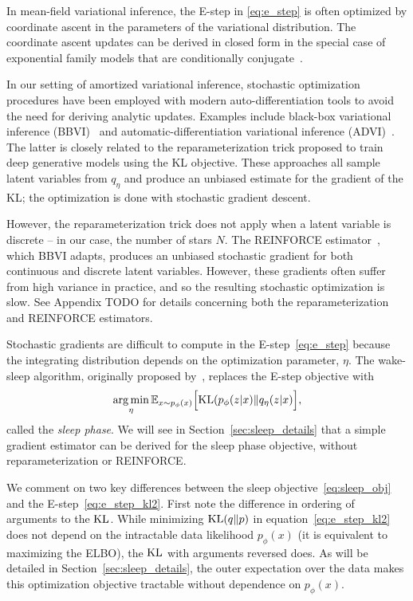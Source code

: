In mean-field variational inference, the E-step in \eqref{eq:e_step} is often optimized by coordinate ascent in the parameters of the variational distribution. 
The coordinate ascent updates can be derived in closed form in the special case of exponential family models that are conditionally conjugate~\cite{Blei_2017_vi_review}. 

In our setting of amortized variational inference, stochastic 
optimization procedures have been employed with modern 
auto-differentiation tools to avoid the need for deriving 
analytic updates. Examples include black-box variational inference (BBVI)~\cite{ranganath2013black} 
and automatic-differentiation variational inference (ADVI)~\cite{kucukelbir2016automatic}. The latter 
is closely related to the reparameterization trick \cite{kingma2013autoencoding, rezende2014stochastic} proposed to train deep generative models using the KL objective. 
These approaches all sample latent variables from $q_\eta$ and produce an unbiased estimate 
for the gradient of the KL; the optimization is done with stochastic gradient descent. 

However, the reparameterization trick does not apply when a latent variable is discrete -- in our case, the number of stars $N$. The REINFORCE estimator~\cite{Williams1992reinforce}, which BBVI adapts, produces an unbiased stochastic gradient for both continuous and discrete latent variables. However, these gradients often suffer from high variance in practice, and so the resulting stochastic optimization is slow. See Appendix TODO for details concerning both the reparameterization and REINFORCE estimators. 

Stochastic gradients are difficult to compute in the E-step~\eqref{eq:e_step} because the integrating distribution depends on the optimization parameter, $\eta$. 
The wake-sleep algorithm, originally proposed by~\cite{Hinton1995wake_sleep}, replaces the 
E-step objective with 
\begin{align}
    \operatorname*{arg\,min}_{\eta} \mathbb{E}_{x \sim p_\phi(x)}\Big[\textrm{KL}(p_\phi(z | x) \| q_\eta(z | x)\Big]
    \label{eq:sleep_obj},
\end{align}
called the {\itshape sleep phase}. We will see in Section~\ref{sec:sleep_details} that a simple gradient estimator can be derived for the sleep phase objective, without 
reparameterization or REINFORCE. 

We comment on two key differences between the sleep objective~\eqref{eq:sleep_obj} and the E-step~\eqref{eq:e_step_kl2}. First note the difference in ordering of arguments to the $\textrm{KL}$. 
While minimizing $\textrm{KL}(q\|p)$ in equation~\eqref{eq:e_step_kl2} does not depend on the intractable 
data likelihood $p_\phi(x)$ (it is equivalent to maximizing the ELBO), the $\textrm{KL}$ with arguments reversed does. 
As will be detailed in Section~\ref{sec:sleep_details}, the outer expectation over the data makes this optimization objective tractable without dependence on $p_\phi(x)$. 

